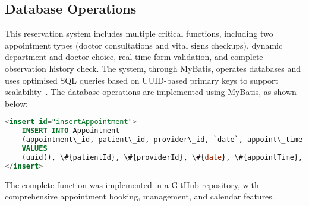 \subsection{Database Operations}
\label{subsec:reservation-database}

This reservation system includes multiple critical functions, including two appointment types (doctor consultations and vital signs checkups), dynamic department and doctor choice, real-time form validation, and complete observation history check. The system, through MyBatis, operates databases and uses optimised SQL queries based on UUID-based primary keys to support scalability~\cite{mybatis}. The database operations are implemented using MyBatis, as shown below:

\begin{lstlisting}[language=SQL, caption=Appointment Insert Query]
<insert id="insertAppointment">
    INSERT INTO Appointment
    (appointment\_id, patient\_id, provider\_id, `date`, appoint\_time, status)
    VALUES
    (uuid(), \#{patientId}, \#{providerId}, \#{date}, \#{appointTime}, \#{status})
</insert>
\end{lstlisting}

The complete function was implemented in a GitHub repository, with comprehensive appointment booking, management, and calendar features.

